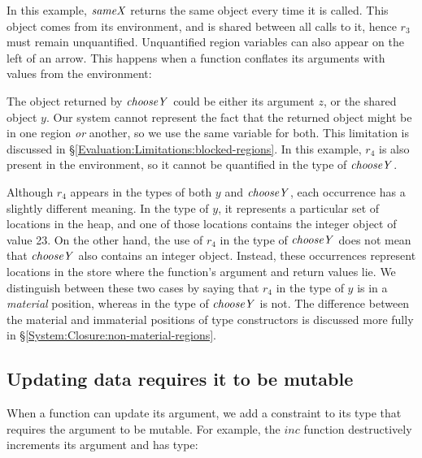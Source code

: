 
In this example, $\operatorname{\mathit{sameX}}$ returns the same object every time it is called. This object comes from its environment, and is shared between all calls to it, hence $r_3$ must remain unquantified. Unquantified region variables can also appear on the left of an arrow. This happens when a function conflates its arguments with values from the environment:


The object returned by $\operatorname{\mathit{chooseY}}$ could be either its argument $z$, or the shared object $y$. Our system cannot represent the fact that the returned object might be in one region \emph{or} another, so we use the same variable for both. This limitation is discussed in \S\ref{Evaluation:Limitations:blocked-regions}. In this example, $r_4$ is also present in the environment, so it cannot be quantified in the type of $\operatorname{\mathit{chooseY}}$. 

Although $r_4$ appears in the types of both $y$ and $\operatorname{\mathit{chooseY}}$, each occurrence has a slightly different meaning. In the type of $y$, it represents a particular set of locations in the heap, and one of those locations contains the integer object of value 23. On the other hand, the use of $r_4$ in the type of $\operatorname{\mathit{chooseY}}$ does not mean that $\operatorname{\mathit{chooseY}}$ also contains an integer object. Instead, these occurrences represent locations in the store where the function's argument and return values lie. We distinguish between these two cases by saying that $r_4$ in the type of $y$ is in a \emph{material} position, whereas in the type of $\operatorname{\mathit{chooseY}}$ is not. The difference between the material and immaterial positions of type constructors is discussed more fully in \S\ref{System:Closure:non-material-regions}.


\subsection{Updating data requires it to be mutable}
\label{System:Regions:update}
When a function can update its argument, we add a constraint to its type that requires the argument to be mutable. For example, the $inc$ function destructively increments its argument and has type:

